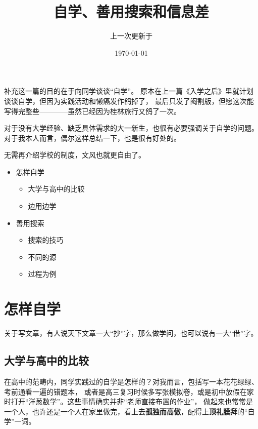 \documentclass[12pt]{article}
\title{自学、善用搜索和信息差}
\author{上一次更新于}
\date{\today}
\begin{document}
\maketitle
补充这一篇的目的在于向同学谈谈“自学”。
原本在上一篇《入学之后》里就计划谈谈自学，但因为实践活动和懒癌发作鸽掉了，
最后只发了阉割版，但愿这次能写得完整些————虽然已经因为桂林旅行又鸽了一次。

对于没有大学经验、缺乏具体需求的大一新生，也很有必要强调关于自学的问题。
对于我本人而言，偶尔这样总结一下，也是很有好处的。

无需再介绍学校的制度，文风也就更自由了。
\begin{itemize}
    \item 怎样自学
        \begin{itemize}
            \item 大学与高中的比较
            \item 边用边学
        \end{itemize}
    \item 善用搜索
        \begin{itemize}
            \item 搜索的技巧
            \item 不同的源
            \item 过程为例
        \end{itemize}
\end{itemize}

\section{怎样自学}

关于写文章，有人说天下文章一大“抄”字，那么做学问，也可以说有一大“借”字。
\subsection{大学与高中的比较}
在高中的范畴内，同学实践过的自学是怎样的？对我而言，包括写一本花花绿绿、考前通看一遍的错题本，
或者是高三复习时候多写张模拟卷，或是初中放假在家时打开“洋葱数学”。这些事情确实并非“老师直接布置的作业”，
做起来也常常是一个人，也许还是一个人在家里做完，看上去\textbf{孤独而高傲}，配得上\textbf{顶礼膜拜}的“自学”一词。
\end{document}
